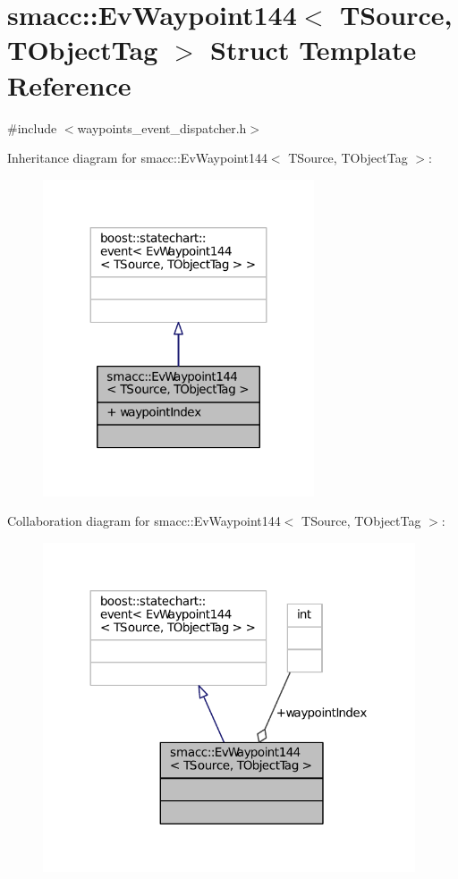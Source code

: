 \hypertarget{structsmacc_1_1EvWaypoint144}{}\section{smacc\+:\+:Ev\+Waypoint144$<$ T\+Source, T\+Object\+Tag $>$ Struct Template Reference}
\label{structsmacc_1_1EvWaypoint144}


{\ttfamily \#include $<$waypoints\+\_\+event\+\_\+dispatcher.\+h$>$}



Inheritance diagram for smacc\+:\+:Ev\+Waypoint144$<$ T\+Source, T\+Object\+Tag $>$\+:
\nopagebreak
\begin{figure}[H]
\begin{center}
\leavevmode
\includegraphics[width=227pt]{structsmacc_1_1EvWaypoint144__inherit__graph}
\end{center}
\end{figure}


Collaboration diagram for smacc\+:\+:Ev\+Waypoint144$<$ T\+Source, T\+Object\+Tag $>$\+:
\nopagebreak
\begin{figure}[H]
\begin{center}
\leavevmode
\includegraphics[width=312pt]{structsmacc_1_1EvWaypoint144__coll__graph}
\end{center}
\end{figure}
